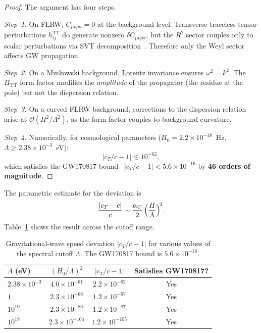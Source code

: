 \documentclass[12pt,a4paper]{article}
\newcommand{\PiTT}{\Pi_{\mathrm{TT}}}
\newcommand{\order}{\mathcal{O}}
\newcommand{\Lam}{\Lambda}
\theoremstyle{plain}
\theoremstyle{definition}
\begin{document}
\begin{proof}
The argument has four steps.\smallskip

\noindent
\textit{Step~1.}
On FLRW, $C_{\mu\nu\rho\sigma} = 0$ at the background level.
Transverse-traceless tensor perturbations $h_{ij}^{\mathrm{TT}}$ do
generate nonzero $\delta C_{\mu\nu\rho\sigma}$, but the $R^2$ sector
couples only to scalar perturbations via SVT
decomposition~\cite{Nersisyan:2018}.  Therefore only the Weyl sector
affects GW propagation.\smallskip

\noindent
\textit{Step~2.}
On a Minkowski background, Lorentz invariance ensures $\omega^2 = k^2$.
The $\PiTT$ form factor modifies the \emph{amplitude} of the propagator
(the residue at the pole) but not the dispersion relation.\smallskip

\noindent
\textit{Step~3.}
On a curved FLRW background, corrections to the dispersion relation arise
at $\order(H^2/\Lam^2)$, as the form factor couples to background
curvature.\smallskip

\noindent
\textit{Step~4.}
Numerically, for cosmological parameters
($H_0 = 2.2 \times 10^{-18}$~Hz, $\Lam \geq 2.38 \times 10^{-3}$~eV):
\begin{equation}\label{eq:cT-bound}
  |c_T/c - 1| \lesssim 10^{-62},
\end{equation}
which satisfies the GW170817 bound~\cite{GW170817:2017}
$|c_T/c - 1| < 5.6 \times 10^{-16}$ by \textbf{46 orders of magnitude}.
\end{proof}

\noindent
The parametric estimate for the deviation is
\begin{equation}\label{eq:cT-parametric}
  \frac{|c_T - c|}{c}
  \sim \frac{\alpha_C}{2}\,\Bigl(\frac{H}{\Lam}\Bigr)^{\!2}.
\end{equation}
Table~\ref{tab:gw-speed} shows the result across the cutoff range.

\begin{table}[H]
\centering
\caption{Gravitational-wave speed deviation $|c_T/c - 1|$ for various
values of the spectral cutoff $\Lam$.  The GW170817 bound is
$5.6 \times 10^{-16}$.}
\label{tab:gw-speed}
\begin{tabular}{lccc}
\toprule
$\Lam$ (eV) & $(H_0/\Lam)^2$ & $|c_T/c - 1|$ & Satisfies GW170817? \\
\midrule
$2.38\times 10^{-3}$ & $4.0\times 10^{-61}$ & $2.2\times 10^{-62}$
  & Yes \\
$1$ & $2.3\times 10^{-66}$ & $1.2\times 10^{-67}$
  & Yes \\
$10^{10}$ & $2.3\times 10^{-86}$ & $1.2\times 10^{-87}$
  & Yes \\
$10^{19}$ & $2.3\times 10^{-104}$ & $1.2\times 10^{-105}$
  & Yes \\
\bottomrule
\end{tabular}
\end{table}
\end{document}
